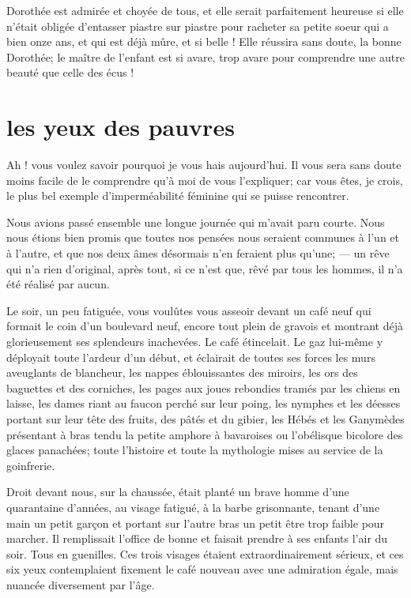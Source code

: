 Dorothée est admirée et choyée de tous, et elle serait parfaitement
heureuse si elle n’était obligée
d’entasser piastre sur piastre pour racheter sa petite
soeur qui a bien onze ans, et qui est déjà mûre, et si belle ! Elle
réussira sans doute, la bonne Dorothée; le maître de
l’enfant est si avare, trop avare pour comprendre une
autre beauté que celle des écus !

\quebra\section[Les yeux des pauvres]{les yeux des pauvres }

Ah ! vous voulez savoir pourquoi je vous hais
aujourd’hui. Il vous sera sans doute moins facile de
le comprendre qu’à moi de vous
l’expliquer; car vous êtes, je crois, le plus bel
exemple d’imperméabilité féminine qui se puisse
rencontrer.

Nous avions passé ensemble une longue journée qui
m’avait paru courte. Nous nous étions bien promis que
toutes nos pensées nous seraient communes à l’un et à
l’autre, et que nos deux âmes désormais
n’en feraient plus qu’une; --- un rêve
qui n’a rien d’original, après tout,
si ce n’est que, rêvé par tous les hommes, il
n’a été réalisé par aucun.

Le soir, un peu fatiguée, vous voulûtes vous asseoir devant un café neuf
qui formait le coin d’un boulevard neuf, encore tout
plein de gravois et montrant déjà glorieusement ses splendeurs
inachevées. Le café étincelait. Le gaz lui{}-même y déployait toute
l’ardeur d’un début, et éclairait de
toutes ses forces les murs aveuglants de blancheur, les nappes
éblouissantes des miroirs, les ors des baguettes et des corniches, les
pages aux joues rebondies tramés par les chiens en laisse, les dames
riant au faucon perché sur leur poing, les nymphes et les déesses
portant sur leur tête des fruits, des pâtés et du gibier, les Hébés et
les Ganymèdes présentant à bras tendu la petite amphore à bavaroises ou
l’obélisque bicolore des glaces panachées; toute
l’histoire et toute la mythologie mises au service de
la goinfrerie.

Droit devant nous, sur la chaussée, était planté un brave homme
d’une quarantaine d’années, au visage
fatigué, à la barbe grisonnante, tenant d’une main un
petit garçon et portant sur l’autre bras un petit être
trop faible pour marcher. Il remplissait l’office de
bonne et faisait prendre à ses enfants l’air du soir.
Tous en guenilles. Ces trois visages étaient extraordinairement
sérieux, et ces six yeux contemplaient fixement le café nouveau avec
une admiration égale, mais nuancée diversement par
l’âge.

